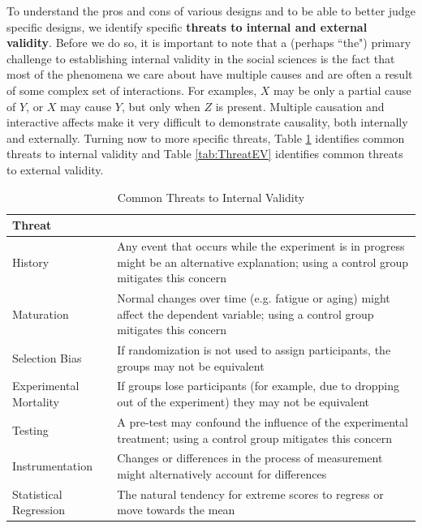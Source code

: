 \documentclass[11pt,openany]{book}\usepackage[]{graphicx}\usepackage[]{color}
\begin{document}
To understand the pros and cons of various designs and to be able to better judge specific designs, we identify specific \textbf{threats to internal and external validity}. Before we do so, it is important to note that a (perhaps ``the") primary challenge to establishing internal validity in the social sciences is the fact that most of the phenomena we care about have multiple causes and are often a result of some complex set of interactions. For examples, $X$ may be only a partial cause of $Y$, or $X$ may cause $Y$, but only when $Z$ is present. Multiple causation and interactive affects make it very difficult to demonstrate causality, both internally and externally. Turning now to more specific threats, Table \ref{tab:ThreatIV} identifies common threats to internal validity and Table \ref{tab:ThreatEV} identifies common threats to external validity.
\begin{table}[h]
\caption{Common Threats to Internal Validity}
\label{tab:ThreatIV}
\begin{tabular}{|p{4cm}|p{9cm}|}
\hline
Threat &  \\ \hline
History & Any event that occurs while the experiment is in progress might be an alternative explanation; using a control group mitigates this concern \\ \hline
Maturation & Normal changes over time (e.g. fatigue or aging) might affect the dependent variable; using a control group mitigates this concern \\ \hline
Selection Bias & If randomization is not used to assign participants, the groups may not be equivalent \\ \hline
Experimental Mortality & If groups lose participants (for example, due to dropping out of the experiment) they may not be equivalent \\ \hline
Testing & A pre-test may confound the influence of the experimental treatment; using a control group mitigates this concern \\ \hline
Instrumentation & Changes or differences in the process of measurement might alternatively account for differences \\ \hline
Statistical Regression & The natural tendency for extreme scores to regress or move towards the mean \\ \hline
\end{tabular}
\end{table}
\FloatBarrier
\end{document}

